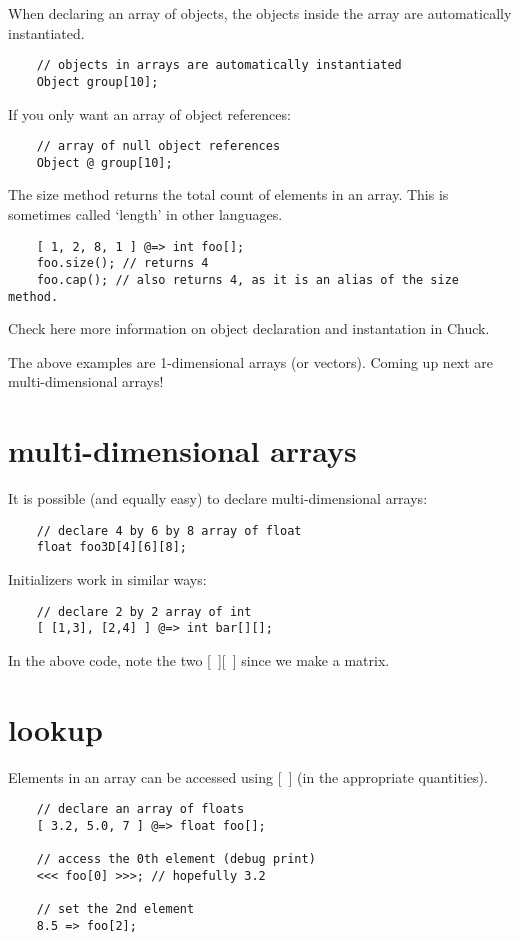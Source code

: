 When declaring an array of objects, the objects inside the array are automatically instantiated.
\begin{verbatim}
    // objects in arrays are automatically instantiated
    Object group[10];
\end{verbatim}

If you only want an array of object references:
\begin{verbatim}
    // array of null object references
    Object @ group[10];
\end{verbatim}

The size method returns the total count of elements in an array. This is sometimes called `length' in other languages.
\begin{verbatim}
    [ 1, 2, 8, 1 ] @=> int foo[];
    foo.size(); // returns 4
    foo.cap(); // also returns 4, as it is an alias of the size method.
\end{verbatim}

Check here more information on object declaration and instantation in Chuck.

The above examples are 1-dimensional arrays (or vectors). Coming up next are multi-dimensional arrays!


\section{multi-dimensional arrays}

It is possible (and equally easy) to declare multi-dimensional arrays:
\begin{verbatim}
    // declare 4 by 6 by 8 array of float
    float foo3D[4][6][8];
\end{verbatim}

Initializers work in similar ways:
\begin{verbatim}
    // declare 2 by 2 array of int
    [ [1,3], [2,4] ] @=> int bar[][];
\end{verbatim}
 In the above code, note the two [~][~] since we make a matrix.


\section{lookup}

Elements in an array can be accessed using [~] (in the appropriate quantities).
\begin{verbatim}
    // declare an array of floats
    [ 3.2, 5.0, 7 ] @=> float foo[];

    // access the 0th element (debug print)
    <<< foo[0] >>>; // hopefully 3.2

    // set the 2nd element
    8.5 => foo[2];
\end{verbatim}

